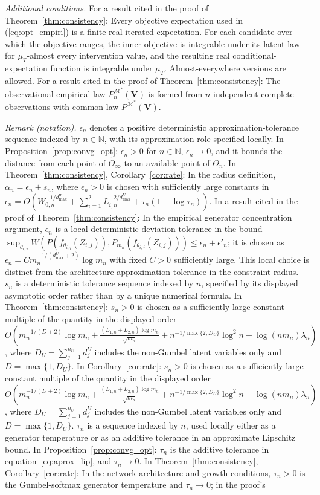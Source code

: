 \documentclass[12pt]{article}
\theoremstyle{plain}
\theoremstyle{definition}
\theoremstyle{remark}
\begin{document}
\emph{Additional conditions.} For a result cited in the proof of Theorem~\ref{thm:consistency}: Every objective expectation used in (\ref{eq:opt_empiri}) is a finite real iterated expectation. For each candidate over which the objective ranges, the inner objective is integrable under its latent law for $\mu_T$-almost every intervention value, and the resulting real conditional-expectation function is integrable under $\mu_T$. Almost-everywhere versions are allowed. For a result cited in the proof of Theorem~\ref{thm:consistency}: The observational empirical law $P_n^{\mathcal M^*}(\boldsymbol V)$ is formed from $n$ independent complete observations with common law $P^{\mathcal M^*}(\boldsymbol V)$.

\noindent\textit{Remark (notation).} $\epsilon_n$ denotes a positive deterministic approximation-tolerance sequence indexed by $n\in\mathbb N$, with its approximation role specified locally. In Proposition~\ref{prop:convg_opt}: $\epsilon_n>0$ for $n\in\mathbb N$, $\epsilon_n\to0$, and it bounds the distance from each point of $\tilde\Theta_\infty$ to an available point of $\Theta_n$. In Theorem~\ref{thm:consistency}, Corollary~\ref{cor:rate}: In the radius definition, $\alpha_n=\epsilon_n+s_n$, where $\epsilon_n>0$ is chosen with sufficiently large constants in $\epsilon_n=O\left(W_{0,n}^{-1/d_{\max}^{\text{in}}}+\sum_{i=1}^2L_{i,n}^{-2/d_{\max}^U}+\tau_n(1-\log\tau_n)\right)$. In a result cited in the proof of Theorem~\ref{thm:consistency}: In the empirical generator concentration argument, $\epsilon_n$ is a local deterministic deviation tolerance in the bound $\sup_{\theta_{i,j}}W(P(f_{\theta_{i,j}}(Z_{i,j})),P_{m_n}(f_{\theta_{i,j}}(Z_{i,j})))\leqslant\epsilon_n+\epsilon'_n$; it is chosen as $\epsilon_n=Cm_n^{-1/(d_{\max}^U+2)}\log m_n$ with fixed $C>0$ sufficiently large. This local choice is distinct from the architecture approximation tolerance in the constraint radius. $s_n$ is a deterministic tolerance sequence indexed by $n$, specified by its displayed asymptotic order rather than by a unique numerical formula. In Theorem~\ref{thm:consistency}: $s_n>0$ is chosen as a sufficiently large constant multiple of the quantity in the displayed order $O\left(m_n^{-1/(D+2)}\log m_n+\frac{(L_{1,n}+L_{2,n})\log m_n}{\sqrt{m_n}}+n^{-1/\max\{2,D_U\}}\log^2 n+\log(nm_n)\lambda_n\right)$, where $D_U=\sum_{j=1}^{n_U}d_j^U$ includes the non-Gumbel latent variables only and $D=\max\{1,D_U\}$. In Corollary~\ref{cor:rate}: $s_n>0$ is chosen as a sufficiently large constant multiple of the quantity in the displayed order $O\left(m_n^{-1/(D+2)}\log m_n+\frac{(L_{1,n}+L_{2,n})\log m_n}{\sqrt{m_n}}+n^{-1/\max\{2,D_U\}}\log^2 n+\log(nm_n)\lambda_n\right)$, where $D_U=\sum_{j=1}^{n_U}d_j^U$ includes the non-Gumbel latent variables only and $D=\max\{1,D_U\}$. $\tau_n$ is a sequence indexed by $n$, used locally either as a generator temperature or as an additive tolerance in an approximate Lipschitz bound. In Proposition~\ref{prop:convg_opt}: $\tau_n$ is the additive tolerance in equation~\ref{eq:aprox_lip}, and $\tau_n\rightarrow0$. In Theorem~\ref{thm:consistency}, Corollary~\ref{cor:rate}: In the network architecture and growth conditions, $\tau_n>0$ is the Gumbel-softmax generator temperature and $\tau_n\rightarrow0$; in the proof's 
\end{document}
